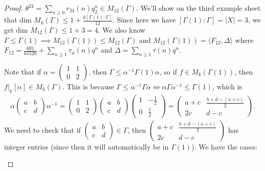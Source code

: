 \documentclass{article}
\theoremstyle{definition}
\begin{document}
\begin{proof}
    $\theta^{24} = \sum_{n\ge 0}^{} r_{24}(n)q_2^n \in M_{12}(\Gamma)$. We'll show on the third example sheet that $\text{dim }M_k(\Gamma)\le 1 + \frac{k[\Gamma(1):\Gamma]}{12}$. Since here we have $[\Gamma(1):\Gamma] = |X| = 3$, we get $\text{dim }M_{12}(\Gamma)\le 1+3=4$. We also know $\Gamma\le \Gamma(1) \implies M_{12}(\Gamma(1))\le M_{12}(\Gamma)$ and $M_{12}(\Gamma(1)) = \langle F_{12}, \Delta \rangle$ where $F_{12} = \frac{691}{65520} + \sum_{n\ge 1}^{} \tau_n(n)q^n$ and $\Delta = \sum_{n\ge 1}^{} \tau(n)q^n$.
    \vspace{1mm}
     
    Note that if $\alpha = \begin{pmatrix} 1&1\\0&2 \end{pmatrix}$, then $\Gamma \le \alpha^{-1} \Gamma(1) \alpha$, so if $f \in M_k(\Gamma(1))$, then $f|_k[\alpha] \in M_k(\Gamma)$. This is because $\Gamma \le \alpha^{-1}\Gamma \alpha \iff \alpha \Gamma \alpha^{-1} \le \Gamma(1)$, which is 
    \begin{align*}
        \alpha \begin{pmatrix} a&b \\c&d\end{pmatrix} \alpha^{-1}= \begin{pmatrix} 1&1\\0&2 \end{pmatrix}\begin{pmatrix} a&b \\c&d\end{pmatrix} \begin{pmatrix} 1 & -\frac{1}{2} \\ 0 & \frac{1}{2} \end{pmatrix} = \begin{pmatrix} a+c & \frac{b+d-(a+c)}{2} \\ 2c & d-c \end{pmatrix}.
    \end{align*}
    We need to check that if $\begin{pmatrix} a&b\\c&d \end{pmatrix} \in \Gamma$, then $\begin{pmatrix} a+c & \frac{b+d-(a+c)}{2} \\ 2c & d-c \end{pmatrix}$ has integer entries (since then it will automatically be in $\Gamma(1)$). We have the cases:
    \begin{itemize}

\end{itemize}
\end{proof}
\end{document}
